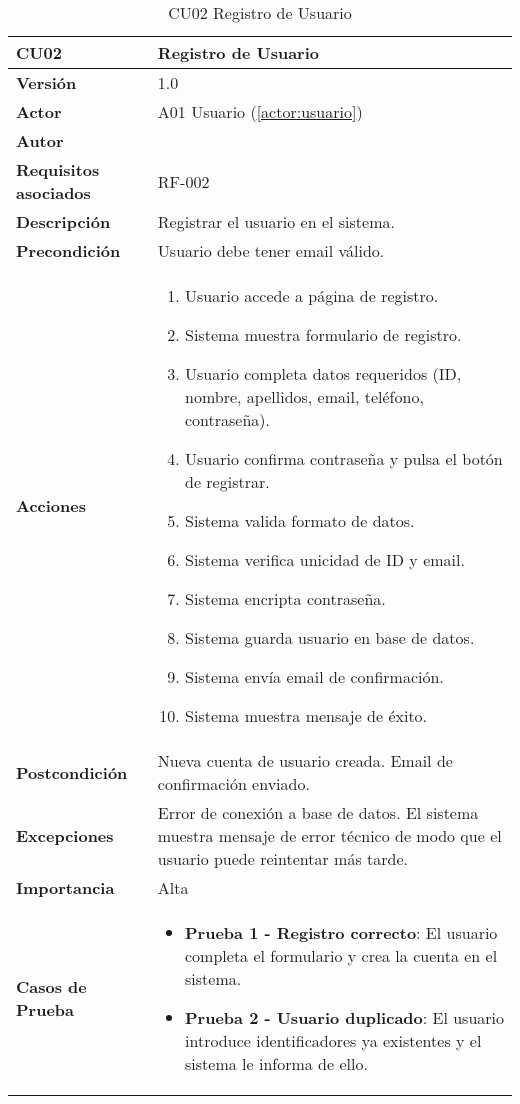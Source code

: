 \begin{table}[H]
	\centering
	\begin{tabularx}{\linewidth}{ p{} p{} }
		\toprule
		\textbf{CU02}    & \textbf{Registro de Usuario} \\
		\toprule
		\textbf{Versión}              & 1.0    \\
		\textbf{Actor}                & A01 Usuario (\ref{actor:usuario}) \\
		\textbf{Autor}                & \nombre \\
		\textbf{Requisitos asociados} & RF-002 \\
		\textbf{Descripción}          & Registrar el usuario en el sistema. \\
		\textbf{Precondición}         & Usuario debe tener email válido. \\
		\textbf{Acciones}             &
		\begin{enumerate}
			\def\labelenumi{\arabic{enumi}.}
			\tightlist
			\item Usuario accede a página de registro.
            \item Sistema muestra formulario de registro.
            \item Usuario completa datos requeridos (ID, nombre, apellidos, email, teléfono, contraseña).
            \item Usuario confirma contraseña y pulsa el botón de registrar.
            \item Sistema valida formato de datos.
            \item Sistema verifica unicidad de ID y email.
            \item Sistema encripta contraseña.
            \item Sistema guarda usuario en base de datos.
            \item Sistema envía email de confirmación.
            \item Sistema muestra mensaje de éxito.
		\end{enumerate}\\
		\textbf{Postcondición}        & Nueva cuenta de usuario creada. Email de confirmación enviado.\\
		\textbf{Excepciones}          &  Error de conexión a base de datos. El sistema muestra mensaje de error técnico de modo que el usuario puede reintentar más tarde.\\
		\textbf{Importancia}          & Alta \\
		\textbf{Casos de Prueba}      &
		\begin{itemize}
			\item \textbf{Prueba 1 - Registro correcto}: El usuario completa el formulario y crea la cuenta en el sistema.
			\item \textbf{Prueba 2 - Usuario duplicado}: El usuario introduce identificadores ya existentes y el sistema le informa de ello.
		\end{itemize} \\
		\bottomrule
	\end{tabularx}
	\caption{CU02 Registro de Usuario}
	\label{cu:registro-usuario}
\end{table}


